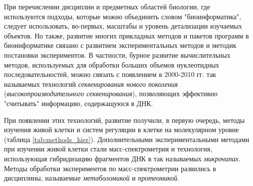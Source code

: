 
При перечислении дисциплин и предметных областей биологии, где используются подходы, которые можно объединить словом "биоинформатика", следует использовать, во-первых, масштабы и уровень детализации изучаемых объектов. Но также, развитие многих прикладных методов и пакетов программ в биоинформатике связано с развитием экспериментальных методов и методик постановки экспериментов. В частности, бурное развитие вычислительных методов, используемых для обработки больших объемов нуклеотидных последовательностей, можно связать с появлением в 2000-2010 гг. так называемых технологий \textit{секвенирования нового поколения} (\textit{высокопроизводительного секвенирования}), позволяющих эффективно "считывать" информацию, содержащуюся в ДНК. 

При появлении этих технологий, развитие получили, в первую очередь, методы изучения живой клетки и систем регуляции в клетке на молекулярном уровне (таблица \ref{tab:methods_hier}). Дополнительными экспериментальными методами при изучении живой клетки стали масс-спектрометрия и технология, использующая гибридизацию фрагментов ДНК в так называемых \textit{микрочипах}. Методы обработки экспериментов по масс-спектрометрии развились в дисциплины, называемые \textit{метаболомикой} и \textit{протеомикой}. 



